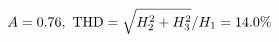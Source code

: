 \documentclass[preview]{standalone}
\begin{document}
\begin{align*}
\special{dvisvgm:raw <g id='unique000'>}A=0.76,\ \text{THD}=\sqrt{H_2^2+H_3^2}/H_1=14.0\%\special{dvisvgm:raw </g>}
\end{align*}
\end{document}
